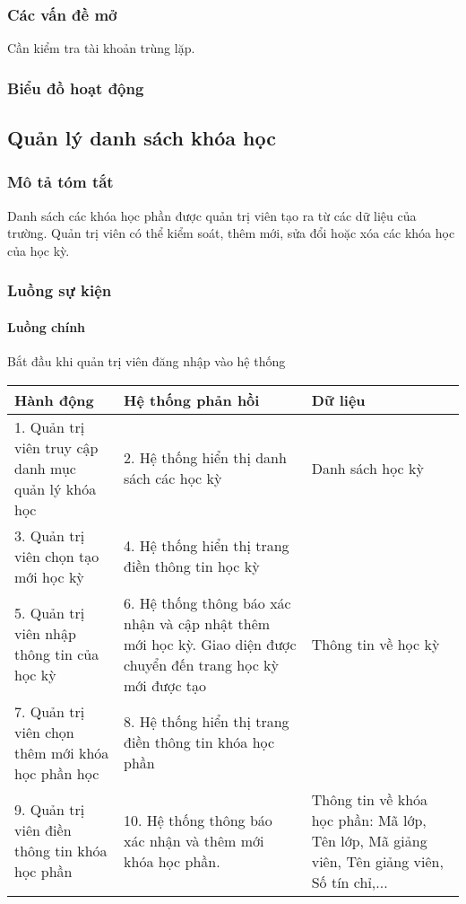 \documentclass[./../main_file.tex]{subfiles}
\begin{document}
\subsubsection{Các vấn đề mở}
Cần kiểm tra tài khoản trùng lặp.

\subsubsection{Biểu đồ hoạt động}

\subsection{Quản lý danh sách khóa học}
\subsubsection{Mô tả tóm tắt}
Danh sách các khóa học phần được quản trị viên tạo ra từ các dữ liệu của trường. Quản trị viên có thể kiểm soát, thêm mới, sửa đổi hoặc xóa các khóa học của học kỳ.

\subsubsection{Luồng sự kiện}
\paragraph{Luồng chính}
Bắt đầu khi quản trị viên đăng nhập vào hệ thống
\begin{longtable}{|p{}|p{}|p{}|}
		\hline
		\textbf{Hành động}                                  & \textbf{Hệ thống phản hồi}                             & \textbf{Dữ liệu} \\ \hline
		1. Quản trị viên truy cập danh mục quản lý khóa học & 2. Hệ thống hiển thị danh sách các học kỳ              & Danh sách học kỳ \\ \hline
		3. Quản trị viên chọn tạo mới học kỳ                & 4. Hệ thống hiển thị trang điền thông tin học kỳ       &                  \\ \hline
		5. Quản trị viên nhập thông tin của học kỳ &
		6. Hệ thống thông báo xác nhận và cập nhật thêm mới học kỳ. Giao diện được chuyển đến trang học kỳ mới được tạo &
		Thông tin về học kỳ \\ \hline
		7. Quản trị viên chọn thêm mới khóa học phần học     & 8. Hệ thống hiển thị trang điền thông tin khóa học phần &                  \\ \hline
		9. Quản trị viên điền thông tin khóa học phần &
		10. Hệ thống thông báo xác nhận và thêm mới khóa học phần. &
		Thông tin về khóa học phần: Mã lớp, Tên lớp, Mã giảng viên, Tên giảng viên, Số tín  chỉ,... \\ \hline
\end{longtable}
\end{document}
